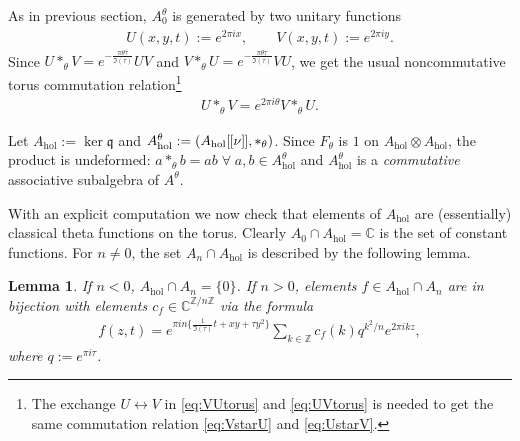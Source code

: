 \documentclass[10pt,a4paper]{amsart}
\numberwithin{equation}{section}
\newtheorem{lem}[thm]{Lemma}
\theoremstyle{definition}
\newcommand{\C}{\mathbb{C}}
\newcommand{\Z}{\mathbb{Z}}
\newcommand{\mf}{\mathfrak}
\newcommand{\lbrak}{[\hspace{-0.5pt}[}
\newcommand{\rbrak}{]\hspace{-0.5pt}]}
\newcommand{\gb}{\mf{q}}
\renewcommand{\hbar}{\nu}
\begin{document}
As in previous section, $A_0^\theta$ is generated by two unitary functions
\begin{gather}\label{eq:UVtorus}
U(x,y,t):=e^{2\pi ix} ,\qquad
V(x,y,t):=e^{2\pi iy} .
\end{gather}
Since $U\ast_\theta V=e^{-\frac{\pi\theta\bar\tau}{\Im(\tau)}}UV$
and
$V\ast_\theta U=e^{-\frac{\pi\theta\tau}{\Im(\tau)}}VU$, we get the usual noncommutative torus commutation relation\footnote{The exchange
$U\leftrightarrow V$ in \eqref{eq:VUtorus} and \eqref{eq:UVtorus} is needed
to get the same commutation relation \eqref{eq:VstarU} and \eqref{eq:UstarV}.}
\begin{gather}\label{eq:UstarV}
U\ast_\theta V=e^{2\pi i\theta} V\ast_\theta U .
\end{gather}

Let $A_{\mathrm{hol}}:=\ker\gb$
and $A_{\mathrm{hol}}^\theta:=(A_{\mathrm{hol}}\lbrak\hbar\rbrak,\ast_\theta)$. Since $F_\theta$ is $1$ on $A_{\mathrm{hol}}\otimes A_{\mathrm{hol}}$, the product is undeformed: $a\ast_\theta b=ab\;\forall\;a,b\in A_{\mathrm{hol}}^\theta$ and $A_{\mathrm{hol}}^\theta$ is a \emph{commutative} associative subalgebra of $A^\theta$.

With an explicit computation we now check that elements of
$A_{\mathrm{hol}}$ are (essentially) classical theta functions on the torus.
Clearly $A_0\cap A_{\mathrm{hol}}=\C$ is the set of constant functions.
For $n\neq 0$, the set $A_n\cap A_{\mathrm{hol}}$ is described by the following lemma.

\begin{lem}
If $n<0$, $A_{\mathrm{hol}}\cap A_n=\{0\}$. If $n>0$, elements $f\in A_{\mathrm{hol}}\cap A_n$ are in bijection with elements $c_f\in\C^{\Z/n\Z}$ via the formula
\begin{gather}\label{eq:theta}
f(z,t)=e^{\pi in\{\frac{1}{\Im(\tau)}t+xy+\tau y^2\}}
\sum_{k\in\Z}c_f(k)q^{k^2/n}e^{2\pi ikz} ,
\end{gather}
where $q:=e^{\pi i\tau}$.
\end{lem}
\end{document}
